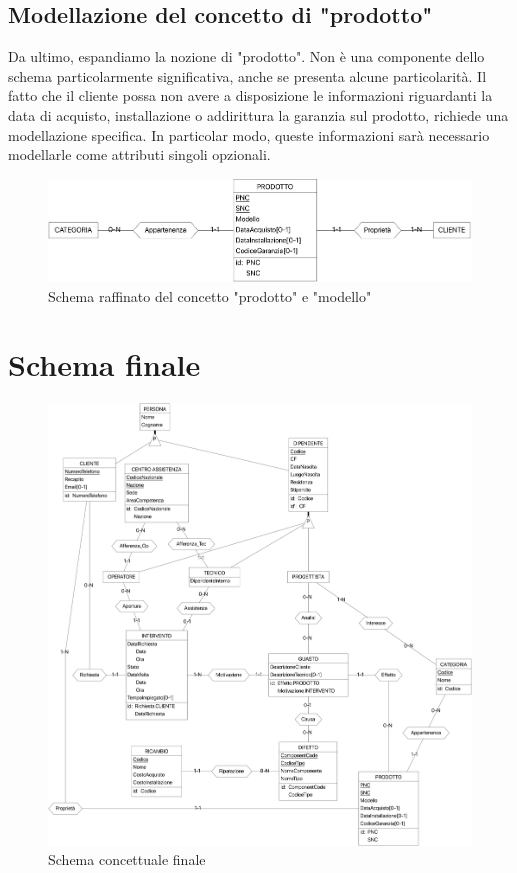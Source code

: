 \documentclass[a4paper, 12pt]{report}
\begin{document}
\subsection{Modellazione del concetto di "prodotto"}

Da ultimo, espandiamo la nozione di "prodotto". Non è una componente dello schema particolarmente significativa, anche se presenta alcune particolarità.
Il fatto che il cliente possa non avere a disposizione le informazioni riguardanti la data di acquisto, installazione o addirittura la garanzia sul
prodotto, richiede una modellazione specifica. In particolar modo, queste informazioni sarà necessario modellarle come attributi singoli opzionali.

\begin{figure}[H]
	\centering
	\includegraphics[width=\linewidth]{images/prodotti.png}
	\caption{Schema raffinato del concetto "prodotto" e "modello"}
\end{figure}

\section{Schema finale}

\begin{figure}[H]
	\centering
	\includegraphics[width=\linewidth]{images/conceptual.png}
	\caption{Schema concettuale finale}
\end{figure}
\end{document}
